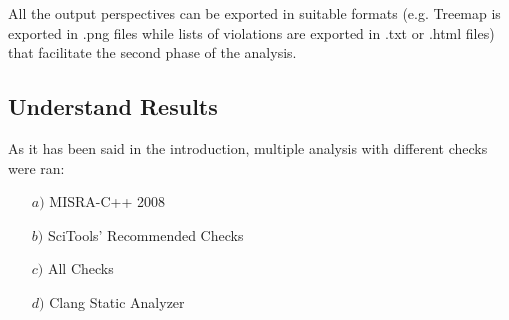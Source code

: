 All the output perspectives can be exported in suitable formats (e.g. Treemap is exported in .png files while lists of violations are exported in .txt or .html files) that facilitate the second phase of the analysis.

\subsection{Understand Results}

As it has been said in the introduction, multiple analysis with different checks were ran:
\begin{itemize}
	\item[$a)$] MISRA-C++ 2008
	\item[$b)$] SciTools' Recommended Checks
	\item[$c)$] All Checks
	\item[$d)$] Clang Static Analyzer
\end{itemize}

